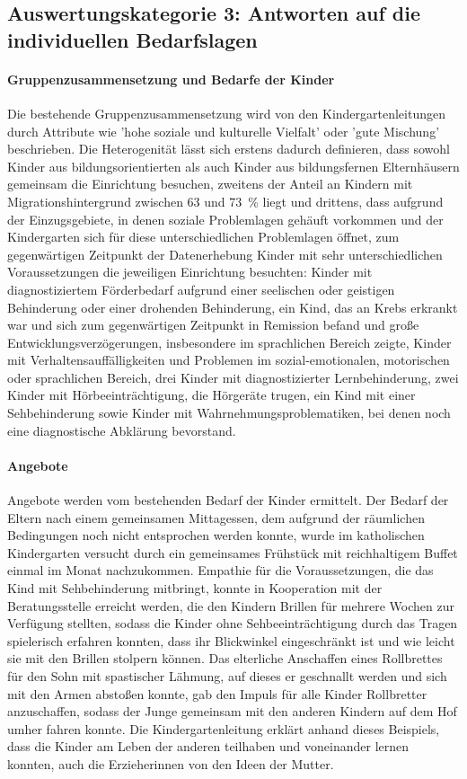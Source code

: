 \subsection{Auswertungskategorie 3: Antworten auf die individuellen Bedarfslagen}

\paragraph{Gruppenzusammensetzung und Bedarfe der Kinder}
Die bestehende Gruppenzusammensetzung wird von den Kindergartenleitungen durch Attribute wie 'hohe soziale und kulturelle Vielfalt' oder 'gute Mischung' beschrieben. Die Heterogenität lässt sich erstens dadurch definieren, dass sowohl Kinder aus bildungsorientierten als auch Kinder aus bildungsfernen Elternhäusern gemeinsam die Einrichtung besuchen, zweitens der Anteil an Kindern mit Migrationshintergrund zwischen 63 und 73 \,\% liegt und drittens, dass aufgrund der Einzugsgebiete, in denen soziale Problemlagen gehäuft vorkommen und der Kindergarten sich für diese unterschiedlichen Problemlagen öffnet, zum gegenwärtigen Zeitpunkt der Datenerhebung Kinder mit sehr unterschiedlichen Voraussetzungen die jeweiligen Einrichtung besuchten: 
Kinder mit diagnostiziertem Förderbedarf aufgrund einer seelischen oder geistigen Behinderung oder einer drohenden Behinderung, ein Kind, das an Krebs erkrankt war und sich zum gegenwärtigen Zeitpunkt in Remission befand und große Entwicklungsverzögerungen, insbesondere im sprachlichen Bereich zeigte, Kinder mit Verhaltensauffälligkeiten und Problemen im sozial-emotionalen, motorischen oder sprachlichen Bereich, drei Kinder mit diagnostizierter Lernbehinderung, zwei Kinder mit Hörbeeinträchtigung, die Hörgeräte trugen, ein Kind mit einer Sehbehinderung sowie Kinder mit Wahrnehmungsproblematiken, bei denen noch eine diagnostische Abklärung bevorstand.

\paragraph{Angebote}
Angebote werden vom bestehenden Bedarf der Kinder ermittelt.
Der Bedarf der Eltern nach einem gemeinsamen Mittagessen, dem aufgrund der räumlichen Bedingungen noch nicht entsprochen werden konnte, wurde im katholischen Kindergarten versucht durch ein gemeinsames Frühstück mit reichhaltigem Buffet einmal im Monat nachzukommen. Empathie für die Voraussetzungen, die das Kind mit Sehbehinderung mitbringt, konnte in Kooperation mit der Beratungsstelle erreicht werden, die den Kindern Brillen für mehrere Wochen zur Verfügung stellten, sodass die Kinder ohne Sehbeeinträchtigung durch das Tragen spielerisch erfahren konnten, dass ihr Blickwinkel eingeschränkt ist und wie leicht sie mit den Brillen stolpern können. 
Das elterliche Anschaffen eines Rollbrettes für den Sohn mit spastischer Lähmung, auf dieses er geschnallt werden und sich mit den Armen abstoßen konnte, gab den Impuls für alle Kinder Rollbretter anzuschaffen, sodass der Junge gemeinsam mit den anderen Kindern auf dem Hof umher fahren konnte. Die Kindergartenleitung erklärt anhand dieses Beispiels, dass die Kinder am Leben der anderen teilhaben und voneinander lernen konnten, auch die Erzieherinnen von den Ideen der Mutter. 

